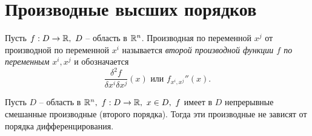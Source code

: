 

\section{Производные высших порядков}

\begin{definition}
    Пусть $ f:D \rightarrow\mathbb{R}, \ D $ -- область в $ \mathbb{R}^n $. Производная по переменной $ x^j $ от производной по переменной $ x^i $ называется \emph{второй производной функции $ f $ по переменным} $ x^i,x^j $ и обозначается
    \[
        \frac{\delta^2f}{\delta x^i\delta x^j}(x)\text{ или }f_{x^i,x^j}''(x).
    \]
\end{definition}

\begin{theorem}
    Пусть $ D $ -- область в $ \mathbb{R}^n, \ f: D \rightarrow\mathbb{R}, \ x \in D, \ f $ имеет в $ D $ непрерывные смешанные производные (второго порядка). Тогда эти производные не зависят от порядка дифференцирования.
\end{theorem}

